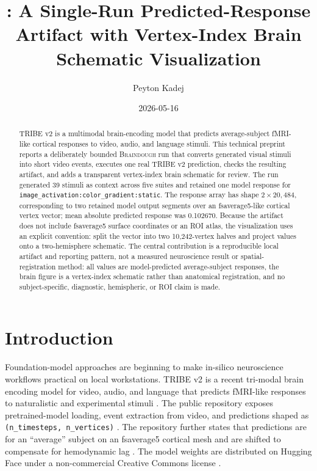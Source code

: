 \documentclass[11pt]{article}
\title{\braindough: A Single-Run \tribe{} Predicted-Response Artifact with Vertex-Index Brain Schematic Visualization}
\author{Peyton Kadej}
\date{2026-05-16}
\newcommand{\braindough}{\textsc{Braindough}}
\newcommand{\tribe}{TRIBE v2}
\newcommand{\meanabs}{0.102670}
\newcommand{\responsevertices}{20{,}484}
\newcommand{\hemivertices}{10{,}242}
\begin{document}
\maketitle

\begin{abstract}
\tribe{} is a multimodal brain-encoding model that predicts average-subject
fMRI-like cortical responses to video, audio, and language stimuli. This
technical preprint reports a deliberately bounded \braindough{} run that
converts generated visual stimuli into short video events, executes one real
\tribe{} prediction, checks the resulting artifact, and adds a transparent
vertex-index brain schematic for review. The run generated 39 stimuli as
context across five suites and retained one model response for
\texttt{image\_activation:color\_gradient:static}. The response array has shape
$2 \times \responsevertices{}$, corresponding to two retained model output
segments over an fsaverage5-like cortical vertex vector; mean absolute
predicted response was \meanabs{}. Because the artifact does not include
fsaverage5 surface coordinates or an ROI atlas, the visualization uses an
explicit convention: split the vector into two \hemivertices{}-vertex halves
and project values onto a two-hemisphere schematic. The central contribution is
a reproducible local artifact and reporting pattern, not a measured
neuroscience result or spatial-registration method: all values are
model-predicted average-subject responses, the brain figure is a vertex-index
schematic rather than anatomical registration, and no subject-specific,
diagnostic, hemispheric, or ROI claim is made.
\end{abstract}

\section{Introduction}

Foundation-model approaches are beginning to make in-silico neuroscience
workflows practical on local workstations. \tribe{} is a recent tri-modal brain
encoding model for video, audio, and language that predicts fMRI-like responses
to naturalistic and experimental stimuli \cite{dascoli2026foundation}. The
public repository exposes pretrained-model loading, event extraction from
video, and predictions shaped as \texttt{(n\_timesteps, n\_vertices)}
\cite{tribev2repo}. The repository further states that predictions are for
an ``average'' subject on an fsaverage5 cortical mesh and are shifted to
compensate for hemodynamic lag \cite{tribev2repo}. The model weights are
distributed on Hugging Face under a non-commercial Creative Commons license
\cite{tribev2hf}.
\end{document}
